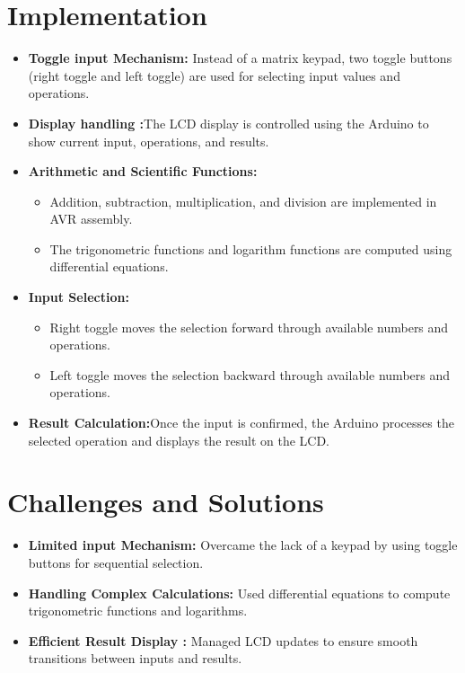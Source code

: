 \documentclass[journal]{IEEEtran}
\begin{document}
\section*{\textbf{Implementation} }
\begin{itemize}
    \item \textbf{Toggle input Mechanism:} Instead of a matrix keypad, two toggle buttons (right toggle and left toggle) are used for selecting input values and operations.
    \item \textbf{Display handling :}The LCD display is controlled using the Arduino to show current input, operations, and results.
    \item \textbf{Arithmetic and Scientific Functions:}\\
    \begin{itemize}
        \item Addition, subtraction, multiplication, and division are implemented in AVR assembly.
        \item The trigonometric functions and logarithm functions are computed using differential equations.
    \end{itemize}
    \item \textbf{Input Selection:}\\
    \begin{itemize}
        \item Right toggle moves the selection forward through available numbers and operations.
        \item Left toggle moves the selection backward through available numbers and operations.
    \end{itemize}
    \item \textbf{Result Calculation:}Once the input is confirmed, the Arduino processes the selected operation and displays the result on the LCD.
\end{itemize}

\section*{\textbf{Challenges and Solutions}}
\begin{itemize}
    \item \textbf{Limited input Mechanism:} Overcame the lack of a keypad by using toggle buttons for sequential selection.
    \item \textbf{Handling Complex Calculations:} Used differential equations to compute trigonometric functions and logarithms.
    \item \textbf{Efficient Result Display :} Managed LCD updates to ensure smooth transitions between inputs and results.
\end{itemize}
\end{document}

